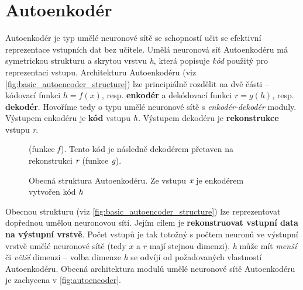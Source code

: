 \section{Autoenkodér}
Autoenkodér je typ umělé neuronové sítě se schopností učit se efektivní reprezentace vstupních dat bez učitele. Umělá neuronová síť Autoenkodéru má symetrickou strukturu a skrytou vrstvu \emph{h}, která popisuje \emph{kód} použitý pro reprezentaci vstupu.
Architekturu Autoenkodéru (viz \autoref{fig:basic_autoencoder_structure}) lze principiálně rozdělit na dvě části – kódovací funkci $h = f(x)$, resp. \textbf{enkodér}
a dekódovací funkci $r = g(h)$, resp. \textbf{dekodér}.
Hovoříme tedy o typu umělé neuronové sítě s \emph{enkodér-dekodér} moduly.
Výstupem enkodéru je \textbf{kód} vstupu $\emph{h}$. Výstupem dekodéru je \textbf{rekonstrukce} vstupu \emph{r}. \cite{Goodfellow2016}

\begin{figure}[h]
    \centering
    \caption{Obecná struktura Autoenkodéru. Ze vstupu $\emph{x}$ je enkodérem vytvořen kód $\emph{h}$} (funkce $\emph{f}$). Tento kód je následně dekodérem přetaven na rekonstrukci $\emph{r}$ (funkce $\emph{g}$).
    \label{fig:basic_autoencoder_structure}
\end{figure}

Obecnou strukturu (viz \autoref{fig:basic_autoencoder_structure}) lze reprezentovat dopřednou umělou neuronovou sítí.
Jejím cílem je \textbf{rekonstruovat vstupní data na výstupní vrstvě}. Počet vstupů je tak totožný s počtem neuronů ve výstupní vrstvě umělé neuronové sítě (tedy $x$ a $r$ mají stejnou dimenzi).
\emph{h} může mít \emph{menší} či \emph{větší} dimenzi – volba dimenze \emph{h} se odvíjí od požadovaných vlastností Autoenkodéru.
Obecná architektura modulů umělé neuronové sítě Autoenkodéru je zachycena v \autoref{fig:autoencoder}. \cite{Charte2018}


